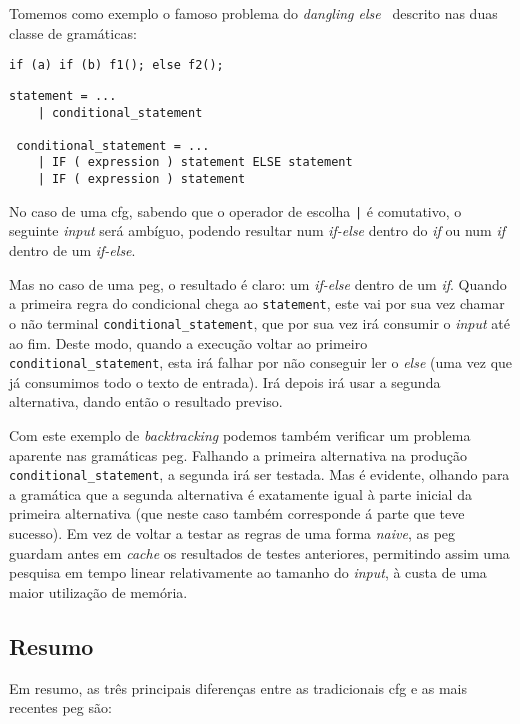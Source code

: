 Tomemos como exemplo o famoso problema do \textit{dangling else}~\cite{dangling-else} descrito nas duas classe de gramáticas:
\begin{lstlisting}[backgroundcolor=\color{softgray},rulecolor=\color{white},framesep=6pt]
 if (a) if (b) f1(); else f2();
\end{lstlisting}

\begin{lstlisting}[caption=Gramática,captionpos=t]
 statement = ...
    | conditional_statement
 
 conditional_statement = ...
    | IF ( expression ) statement ELSE statement
    | IF ( expression ) statement
\end{lstlisting}

No caso de uma \acrshort{cfg}, sabendo que o operador de escolha \texttt{|} é comutativo, o seguinte \textit{input} será ambíguo, podendo resultar num \textit{if-else} dentro do \textit{if} ou num \textit{if} dentro de um \textit{if-else}.

Mas no caso de uma \acrshort{peg}, o resultado é claro: um \textit{if-else} dentro de um \textit{if}. Quando a primeira regra do condicional chega ao \texttt{statement}, este vai por sua vez chamar o não terminal \texttt{conditional\_statement}, que por sua vez irá consumir o \textit{input} até ao fim. Deste modo, quando a execução voltar ao primeiro \texttt{conditional\_statement}, esta irá falhar por não conseguir ler o \textit{else} (uma vez que já consumimos todo o texto de entrada). Irá depois irá usar a segunda alternativa, dando então o resultado previso.

Com este exemplo de \textit{backtracking} podemos também verificar um problema aparente nas gramáticas \acrshort{peg}. Falhando a primeira alternativa na produção \texttt{conditional\_statement}, a segunda irá ser testada. Mas é evidente, olhando para a gramática que a segunda alternativa é exatamente igual à parte inicial da primeira alternativa (que neste caso também corresponde á parte que teve sucesso). Em vez de voltar a testar as regras de uma forma \textit{naive}, as \acrlong{peg} guardam antes em \textit{cache} os resultados de testes anteriores, permitindo assim uma pesquisa em tempo linear relativamente ao tamanho do \textit{input}, à custa de uma maior utilização de memória.


\subsection{Resumo}
Em resumo, as três principais diferenças entre as tradicionais \acrfull{cfg} e as mais recentes \acrfull{peg} são:


